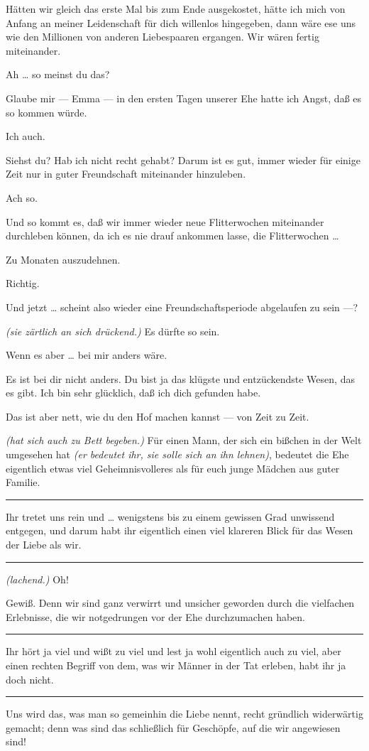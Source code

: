 \documentclass[
	final,
	a4paper,
	ngerman,
	mpinclude = true, %
	twoside = true,
	open = right,
	cleardoublepage = plain,
	DIV = 13,
	BCOR = 1cm,
	titlepage = firstiscover,
	]{scrbook}
\newcommand{\direction}[1]{\textit{(#1)}}
\newenvironment{deletion}{%
		\vspace{0.25\baselineskip}
		\hrule
		\vspace{0.25\baselineskip}
		\color{darkgray}
	}{
		\color{black}
		\vspace{0.25\baselineskip}
		\hrule 
		\vspace{0.25\baselineskip}
	}
\newcommand{\thecharacter}[1]{\textup{\textsc{#1}}\xspace}
\newcommand{\thefrau}{\thecharacter{Junge Frau}}
\newcommand{\thegatte}{\thecharacter{Gatte}}
\newcommand{\character}[1]{\item[#1:]}
\newcommand{\frau}{\character{\thefrau}}
\newcommand{\gatte}{\character{\thegatte}}
\begin{document}
\begin{play}
	\gatte
	Hätten wir gleich das erste Mal bis zum Ende ausgekostet, hätte ich mich von Anfang an meiner Leidenschaft für dich willenlos hingegeben, dann wäre ese uns wie den Millionen von anderen Liebespaaren ergangen. Wir wären fertig miteinander.

	\frau
	Ah \ldots{} so meinst du das?

	\gatte
	Glaube mir --- Emma --- in den ersten Tagen unserer Ehe hatte ich Angst, daß es so kommen würde.

	\frau
	Ich auch.

	\gatte
	Siehst du? Hab ich nicht recht gehabt? Darum ist es gut, immer wieder für einige Zeit nur in guter Freundschaft miteinander hinzuleben.

	\frau
	Ach so.

	\gatte
	Und so kommt es, daß wir immer wieder neue Flitterwochen miteinander durchleben können, da ich es nie drauf ankommen lasse, die Flitterwochen \ldots{}

	\frau
	Zu Monaten auszudehnen.

	\gatte
	Richtig.

	\frau
	Und jetzt \ldots{} scheint also wieder eine Freundschaftsperiode abgelaufen zu sein ---?

	\gatte
	\direction{sie zärtlich an sich drückend.} Es dürfte so sein.

	\frau
	Wenn es aber \ldots{} bei mir anders wäre.

	\gatte
	Es ist bei dir nicht anders. Du bist ja das klügste und entzückendste Wesen, das es gibt. Ich bin sehr glücklich, daß ich dich gefunden habe.

	\frau
	Das ist aber nett, wie du den Hof machen kannst --- von Zeit zu Zeit.

	\gatte
	\direction{hat sich auch zu Bett begeben.} Für einen Mann, der sich ein bißchen in der Welt umgesehen hat \direction{er bedeutet ihr, sie solle sich an ihn lehnen}, bedeutet die Ehe eigentlich etwas viel Geheimnisvolleres als für euch junge Mädchen aus guter Familie.
	\begin{deletion}
		Ihr tretet uns rein und \ldots{} wenigstens bis zu einem gewissen Grad unwissend entgegen, und darum habt ihr eigentlich einen viel klareren Blick für das Wesen der Liebe als wir.
	\end{deletion}

	\frau
	\direction{lachend.} Oh!

	\gatte
	Gewiß. Denn wir sind ganz verwirrt und unsicher geworden durch die vielfachen Erlebnisse, die wir notgedrungen vor der Ehe durchzumachen haben.
	\begin{deletion}
		Ihr hört ja viel und wißt zu viel und lest ja wohl eigentlich auch zu viel, aber einen rechten Begriff von dem, was wir Männer in der Tat erleben, habt ihr ja doch nicht.
	\end{deletion}
	Uns wird das, was man so gemeinhin die Liebe nennt, recht gründlich widerwärtig gemacht; denn was sind das schließlich für Geschöpfe, auf die wir angewiesen sind!


\end{play}
\end{document}
